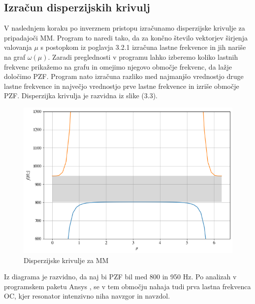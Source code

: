 \documentclass[12pt]{report}
\begin{document}
\subsection{Izračun disperzijskih krivulj}
V naslednjem koraku po inverznem pristopu izračunamo disperzijske krivulje za pripadajoči \ac{MM}. Program to naredi tako, da za končno število vektorjev širjenja valovanja $\mu$ s postopkom iz poglavja 3.2.1 izračuna
lastne frekvence in jih nariše na graf $\omega(\mu)$. Zaradi preglednosti v programu lahko izberemo koliko lastnih frekvenc prikažemo na grafu in omejimo njegovo območje frekvenc, da lažje določimo \ac{PZF}.
Program nato izračuna razliko med najmanjšo vrednostjo druge lastne frekvence in največjo vrednostjo prve lastne frekvence in izriše območje \ac{PZF}. Disperzijka krivulja je razvidna iz slike (3.3).
\begin{figure}[H]
  \centering
  \includegraphics[scale=0.6]{Images/dispersion.png}
  \caption{Disperzijske krivulje za \ac{MM}}
\end{figure}
Iz diagrama je razvidno, da naj bi \ac{PZF} bil med 800 in 950 Hz. Po analizah v programskem paketu Ansys \cite{ansys}, se v tem območju nahaja tudi prva lastna frekvenca
\ac{OC}, kjer resonator intenzivno niha navzgor in navzdol.
\end{document}
